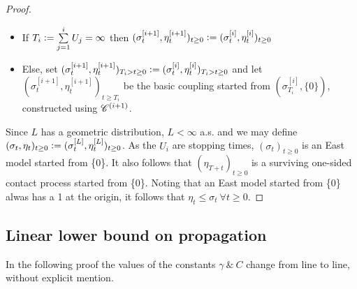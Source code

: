 \begin{proof}
\begin{enumerate}
\begin{itemize}
    \item If $T_i \vcentcolon= \sum\limits^i_{j=1} U_j = \infty$ then $(\sigma^{[i+1]}_t, \eta^{[i+1]}_t)_{t \geq 0} \vcentcolon= (\sigma^{[i]}_t, \eta^{[i]}_t)_{t \geq 0}$
    \item Else, set $(\sigma^{[i+1]}_t, \eta^{[i+1]}_t)_{T_i > t \geq 0} \vcentcolon= (\sigma^{[i]}_t, \eta^{[i]}_t)_{T_i > t \geq 0}$ and let $(\sigma^{[i+1]}_t, \eta^{[i+1]}_t)_{t \geq T_i}$ be the basic coupling started from $(\sigma^{[i]}_{T_i}, \{0\})$, constructed using $\mathscr{C}^{(i+1)}$. 
  \end{itemize}
\end{enumerate}
Since $L$ has a geometric distribution, $L < \infty$ a.s. and we may define $(\sigma_t, \eta_t)_{t \geq 0} \vcentcolon= (\sigma^{[L]}_t, \eta^{[L]}_t)_{t \geq 0}$. As the $U_i$ are stopping times, $(\sigma_t)_{t \geq 0}$ is an East model started from \{0\}. It also follows that $(\eta_{T+t})_{t \geq 0}$ is a surviving one-sided contact process started from \{0\}. Noting that an East model started from \{0\} alwas has a 1 at the origin, it follows that $\eta_t \leq \sigma_t\ \forall t \geq 0$. 
\end{proof}

\subsection{Linear lower bound on propagation}

\begin{remark}
In the following proof the values of the constants $\gamma\ \&\ C$ change from line to line, without explicit mention. 
\end{remark}


